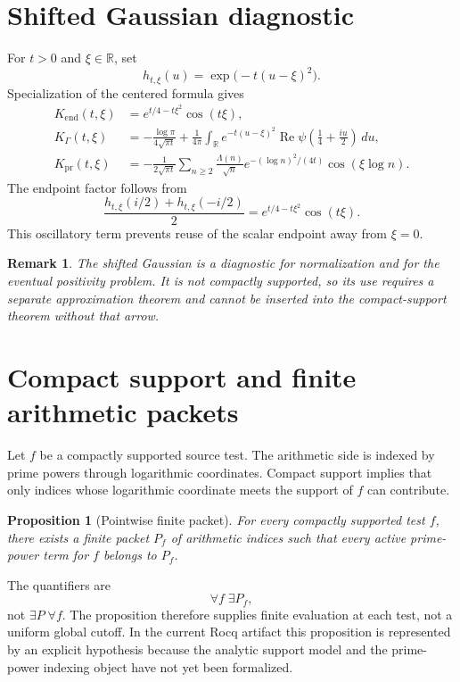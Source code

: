 \documentclass[11pt]{article}
\newtheorem{proposition}[theorem]{Proposition}
\newtheorem{remark}[theorem]{Remark}
\newcommand{\R}{\mathbb R}
\newcommand{\Lam}{\Lambda}
\begin{document}
\section{Shifted Gaussian diagnostic}
For $t>0$ and $\xi\in\R$, set
\[
 h_{t,\xi}(u)=\exp\bigl(-t(u-\xi)^2\bigr).
\]
Specialization of the centered formula gives
\begin{align}
K_{\mathrm{end}}(t,\xi)
 &=e^{t/4-t\xi^2}\cos(t\xi),\\
K_{\Gamma}(t,\xi)
 &=-\frac{\log\pi}{4\sqrt{\pi t}}
   +\frac{1}{4\pi}\int_{\R}e^{-t(u-\xi)^2}
     \operatorname{Re}\psi\!\left(\frac14+\frac{iu}{2}\right)\,du,\\
K_{\mathrm{pr}}(t,\xi)
 &=-\frac{1}{2\sqrt{\pi t}}
   \sum_{n\ge2}\frac{\Lam(n)}{\sqrt n}
   e^{-(\log n)^2/(4t)}\cos(\xi\log n).
\end{align}
The endpoint factor follows from
\[
 \frac{h_{t,\xi}(i/2)+h_{t,\xi}(-i/2)}{2}
 =e^{t/4-t\xi^2}\cos(t\xi).
\]
This oscillatory term prevents reuse of the scalar endpoint away from $\xi=0$.

\begin{remark}
The shifted Gaussian is a diagnostic for normalization and for the eventual positivity problem. It is not compactly supported, so its use requires a separate approximation theorem and cannot be inserted into the compact-support theorem without that arrow.
\end{remark}

\section{Compact support and finite arithmetic packets}
Let $f$ be a compactly supported source test. The arithmetic side is indexed by prime powers through logarithmic coordinates. Compact support implies that only indices whose logarithmic coordinate meets the support of $f$ can contribute.

\begin{proposition}[Pointwise finite packet]
For every compactly supported test $f$, there exists a finite packet $P_f$ of arithmetic indices such that every active prime-power term for $f$ belongs to $P_f$.
\end{proposition}

The quantifiers are
\[
 \forall f\;\exists P_f,
\]
not $\exists P\;\forall f$. The proposition therefore supplies finite evaluation at each test, not a uniform global cutoff. In the current Rocq artifact this proposition is represented by an explicit hypothesis because the analytic support model and the prime-power indexing object have not yet been formalized.
\end{document}
